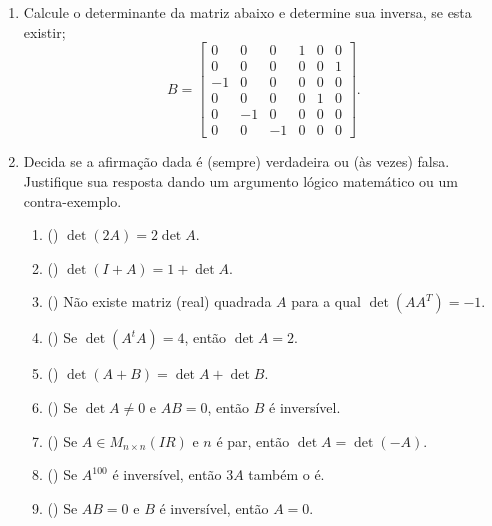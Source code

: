 \documentclass{report}
\newcommand{\real}{I\!\!R}               %
\begin{document}
\begin{Exercise}
\begin{enumerate}
\item \label{1lista40} Calcule o determinante da matriz abaixo e
determine sua inversa, se esta existir; $$B=\left[
\begin{array}{rrrrrr}
0 & 0 & 0 & 1 & 0 & 0 \\
0 & 0 & 0 & 0 & 0 & 1\\
-1 & 0 & 0 & 0 & 0 & 0\\
0 & 0 & 0 & 0 & 1 & 0 \\
0 & -1 & 0 & 0 & 0 & 0 \\
0 & 0 & -1 & 0 & 0 & 0
\end{array}
\right].$$


\item \label{1lista41}  Decida se a afirmação dada é (sempre)
verdadeira ou (às vezes) falsa. Justifique sua resposta dando um
argumento lógico matemático ou um contra-exemplo.

\begin{enumerate}
\item  (\quad ) $\det ( 2A) =2\det A $.

\item  (\quad ) $\det ( I+A) =1+\det A $.

\item  (\quad ) Não existe matriz (real) quadrada $A$ para a qual
$\det \left( AA^{T}\right) =-1$.

\item  (\quad ) Se $\det (A^tA) =4$, então $\det A =2 $.

\item  (\quad ) $\det (A + B) =\det A + \det B $.

\item  (\quad ) Se $\det A \ne 0$ e $AB = 0$, então $B$ é
inversível.

\item  (\quad ) Se $A \in M_{n \times n} ( \real)$ e $n$ é par,
então $\det A = \det (-A)$.

\item  (\quad ) Se $A^{100}$ é inversível, então $3A$ também o é.

\item  (\quad ) Se $AB = 0$ e $B$ é inversível, então $A=0$.
\end{enumerate}



\end{enumerate}
\end{Exercise}
\end{document}
